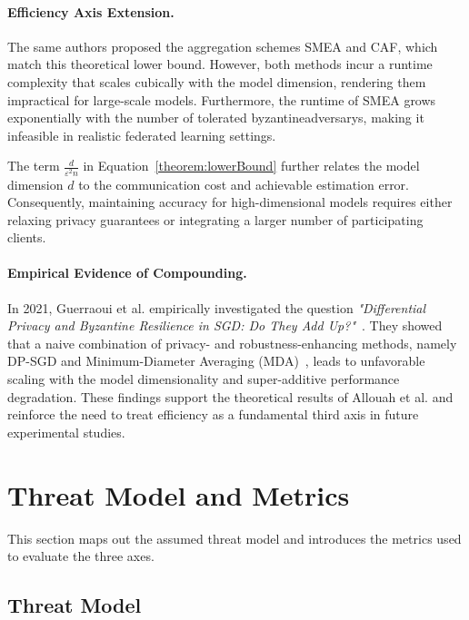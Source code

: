 \documentclass[11pt,twocolumn,a4paper,DIV=calc,parskip=half]{scrartcl}
\begin{document}
	\paragraph{Efficiency Axis Extension.}
	
	The same authors proposed the aggregation schemes \ac{SMEA} and \ac{CAF}, which match this theoretical lower bound. However, both methods incur a runtime complexity that scales cubically with the model dimension, rendering them impractical for large-scale models. Furthermore, the runtime of SMEA grows exponentially with the number of tolerated \glspl{byzantineadversary}, making it infeasible in realistic federated learning settings.
	
	The term $\frac{d}{\varepsilon^2 n}$ in Equation~\ref{theorem:lowerBound} further relates the model dimension $d$ to the communication cost and achievable estimation error. Consequently, maintaining accuracy for high-dimensional models requires either relaxing privacy guarantees or integrating a larger number of participating clients.
	
	
	\paragraph{Empirical Evidence of Compounding.}
	
	In 2021, Guerraoui et al. empirically investigated the question \textit{"Differential Privacy and Byzantine Resilience in SGD: Do They Add Up?"}~\cite{guerraoui2021differentialprivacybyzantineresilience}. They showed that a naive combination of privacy- and robustness-enhancing methods, namely \ac{DP-SGD} and Minimum-Diameter Averaging (MDA)~\cite{elmhamdi2020genuinelydistributedbyzantinemachine}, leads to unfavorable scaling with the model dimensionality and super-additive performance degradation. These findings support the theoretical results of Allouah et al. and reinforce the need to treat efficiency as a fundamental third axis in future experimental studies.

	
	\section{Threat Model and Metrics}
	\label{sec:threat}
	This section maps out the assumed threat model and introduces the metrics used to evaluate the three axes.
	
	\subsection{Threat Model}
	
\end{document}
